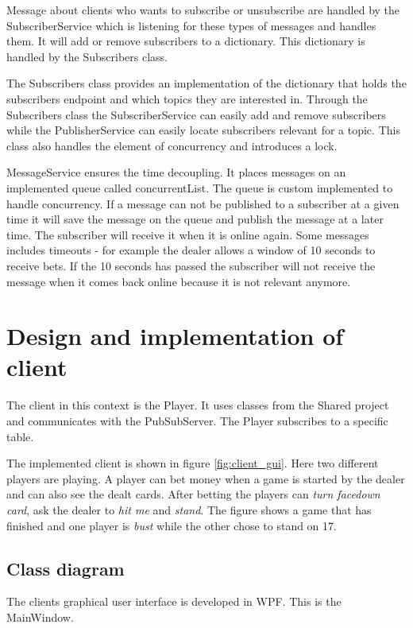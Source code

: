 Message about clients who wants to subscribe or unsubscribe are handled by the SubscriberService which is listening for these types of messages and handles them. It will add  or remove subscribers to a dictionary. This dictionary is handled by the Subscribers class.

The Subscribers class provides an implementation of the dictionary that holds the subscribers endpoint and which topics they are interested in. Through the Subscribers class the SubscriberService can easily add and remove subscribers while the PublisherService can easily locate subscribers relevant for a topic. This class also handles the element of concurrency and introduces a lock.

MessageService ensures the time decoupling. It places messages on an implemented queue called concurrentList. The queue is custom implemented to handle concurrency. If a message can not be published to a subscriber at a given time it will save the message on the queue and publish the message at a later time. The subscriber will receive it when it is online again. Some messages includes timeouts - for example the dealer allows a window of 10 seconds to receive bets. If the 10 seconds has passed the subscriber will not receive the message when it comes back online because it is not relevant anymore.
\FloatBarrier

\section{Design and implementation of client}
The client in this context is the Player. It uses classes from the Shared project and communicates with the PubSubServer. The Player subscribes to a specific table.


The implemented client is shown in figure \ref{fig:client_gui}. Here two different players are playing. A player can bet money when a game is started by the dealer and can also see the dealt cards. After betting the players can \emph{turn facedown card}, ask the dealer to \emph{hit me} and \emph{stand}. The figure shows a game that has finished and one player is \emph{bust} while the other chose to stand on 17.
\FloatBarrier


\subsection{Class diagram}
The clients graphical user interface is developed in WPF. This is the MainWindow.

